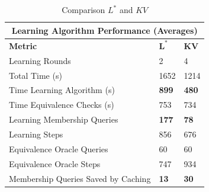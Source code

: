 \begin{table}[h]
	\centering
	\begin{tabular}{ |p{6.5cm}||p{1cm}|p{1cm}|  }
		\hline
		\multicolumn{3}{|c|}{\textbf{Learning Algorithm Performance (Averages)}} \\
		\hline
		\textbf{Metric} & $\mathbf{L^*}$ & $\mathbf{KV}$ \\
		\hline
		Learning Rounds							&	2				&	4 				\\
		Total Time (s)							&   1652			& 	1214   			\\
		Time Learning Algorithm	(s)				&	\textbf{899}	& 	\textbf{480}	\\
		Time Equivalence Checks (s)				& 	753				& 	734			\\
		Learning Membership Queries 			&   \textbf{177}	& 	\textbf{78}		\\
		Learning Steps							& 	856	  			& 	676   			\\
		Equivalence Oracle Queries				& 	60  			&  	60				\\
		Equivalence Oracle Steps				& 	747  			&  	934				\\
		Membership Queries Saved by Caching		& 	\textbf{13}		&  	\textbf{30}				\\
		\hline
	\end{tabular}
	\caption{Comparison $L^*$ and $KV$}
	\label{tab:compkvlstar}
\end{table}
\newpage

